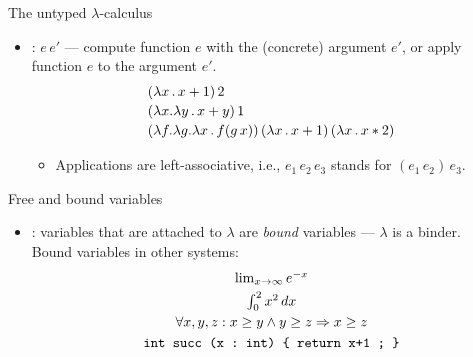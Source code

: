 \documentclass[paper=screen,mode=present,style=zysimple]{powerdot}
\begin{document}
\begin{slide}{The untyped $\lambda$-calculus}
\begin{itemize}
\item {}: $e \, e'$ --- compute function $e$ with the (concrete) argument $e'$, 
  or apply function $e$ to the argument $e'$.
\[
\begin{array}{l}
(\lambda x \, . \, x + 1) \, 2 \\[0.2em]
(\lambda x . \lambda y \, . \, x + y) \, 1 \\[0.2em]
(\lambda f . \lambda g . \lambda x \, . \, f (g \, x)) \, (\lambda x \, . \, x + 1) \, (\lambda x \, . \, x * 2)
\end{array}
\]
\begin{itemize}
\item Applications are left-associative, i.e., $e_1 \, e_2 \, e_3$ stands for $(e_1 \, e_2) \, e_3$.
\end{itemize}
\end{itemize}
\end{slide}

\begin{slide}[method=direct]{Free and bound variables}
\begin{itemize}
\item {}: variables that are attached to $\lambda$ are {\em bound} variables 
--- $\lambda$ is a binder. 
\\
Bound variables in other systems: \vspace*{-0.5em}
\[
\begin{array}{c}
\lim_{x \to \infty} e^{-x} \\[0.3em]
\int_0^2 x^2 \, dx \\[0.3em]
\forall x, y, z: x \geq y \wedge y \geq z \Rightarrow x \geq z \\[0.3em]
\verb|int succ (x : int) { return x+1 ; }| 
\end{array}
\]
\end{itemize}
\end{slide}
\end{document}
